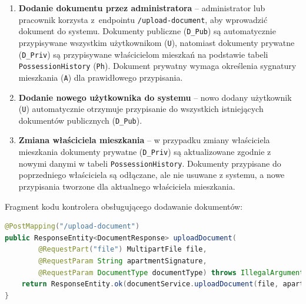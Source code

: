 \begin{enumerate}
    \item \textbf{Dodanie dokumentu przez administratora} --
    administrator lub pracownik korzysta z~endpointu \texttt{/upload-document}, aby wprowadzić dokument do systemu. Dokumenty publiczne (\texttt{D\_Pub}) są automatycznie przypisywane wszystkim użytkownikom (\texttt{U}), natomiast dokumenty prywatne (\texttt{D\_Priv}) są przypisywane właścicielom mieszkań na podstawie tabeli \texttt{PossessionHistory} (\texttt{Ph}). Dokument prywatny wymaga określenia sygnatury mieszkania (\texttt{A}) dla prawidłowego przypisania.

    \item \textbf{Dodanie nowego użytkownika do systemu} --
    nowo dodany użytkownik (\texttt{U}) automatycznie otrzymuje przypisanie do wszystkich istniejących dokumentów publicznych (\texttt{D\_Pub}).

    \item \textbf{Zmiana właściciela mieszkania} --  
    w przypadku zmiany właściciela mieszkania dokumenty prywatne (\texttt{D\_Priv}) są aktualizowane zgodnie z nowymi danymi w tabeli \texttt{PossessionHistory}. Dokumenty przypisane do poprzedniego właściciela są odłączane, ale nie usuwane z systemu, a nowe przypisania tworzone dla aktualnego właściciela mieszkania.
\end{enumerate}


Fragment kodu kontrolera obsługującego dodawanie dokumentów:
\begin{lstlisting}[language=Java, style=JavaStyle, caption=Fragment klasy \texttt{DocumentController}]
@PostMapping("/upload-document")
public ResponseEntity<DocumentResponse> uploadDocument(
        @RequestPart("file") MultipartFile file,
        @RequestParam String apartmentSignature,
        @RequestParam DocumentType documentType) throws IllegalArgumentException, IOException {
    return ResponseEntity.ok(documentService.uploadDocument(file, apartmentSignature, documentType));
}
\end{lstlisting}

